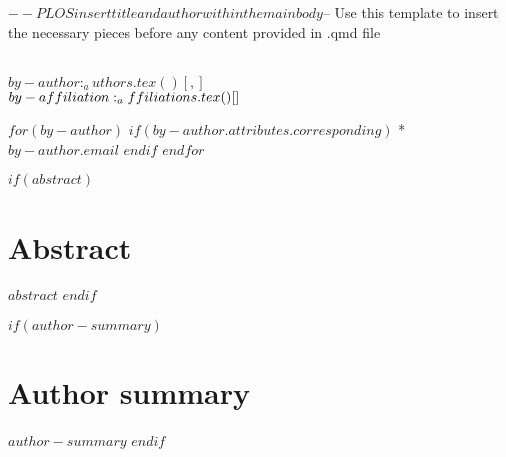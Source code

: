 $-- PLOS insert title and author within the main body
$-- Use this template to insert the necessary pieces before any content provided in .qmd file
\vspace*{0.2in}

\begin{flushleft}
{\Large
\textbf{} %
}
\newline
\\
$by-author:_authors.tex()[, ]$
\\
\bigskip
$by-affiliation:_affiliations.tex()[\\ ]$
\bigskip

% 
%





$for(by-author)$
$if(by-author.attributes.corresponding)$
* $by-author.email$
$endif$
$endfor$

\end{flushleft}

$if(abstract)$
\section*{Abstract}
$abstract$
$endif$

$if(author-summary)$
\section*{Author summary}
$author-summary$
$endif$

\linenumbers